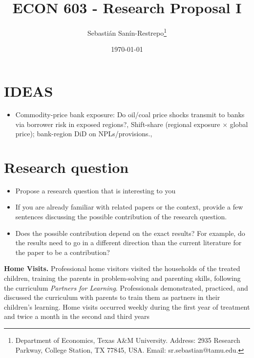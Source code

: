 


\title{\Large \textbf{ECON 603 - Research Proposal I}}

\author{Sebasti\'an San\'in-Restrepo\thanks{Department of Economics, Texas A\&M University. Address: 2935 Research Parkway, College Station, TX 77845, USA. Email: sr.sebastian@tamu.edu.}} 
\date{\today}

\maketitle
\thispagestyle{empty} 
\doublespacing
\thispagestyle{empty} 

\vspace{0mm}

\doublespacing

\section*{IDEAS}
\begin{itemize}
	\item Commodity-price bank exposure: Do oil/coal price shocks transmit to banks via borrower risk in exposed regions?, Shift-share (regional exposure × global price); bank-region DiD on NPLs/provisions., 


\end{itemize}
\section{ Research question} \label{section:rq} 

\begin{itemize}
	\item Propose a research question that is interesting to you
	\item If you are already familiar with related papers or the context, provide a few
	sentences discussing the possible contribution of the research question.
	\item Does the possible contribution depend on the exact results? For example, do the
	results need to go in a different direction than the current literature for the paper
	to be a contribution?
\end{itemize}

\noindent \textbf{Home Visits.} Professional home visitors visited the households of the treated children, training the parents in problem-solving and parenting skills, following the curriculum \textit{Partners for Learning}. Professionals demonstrated, practiced, and discussed the curriculum with parents to train them as partners in their children's learning. Home visits occurred weekly during the first year of treatment and twice a month in the second and third years

